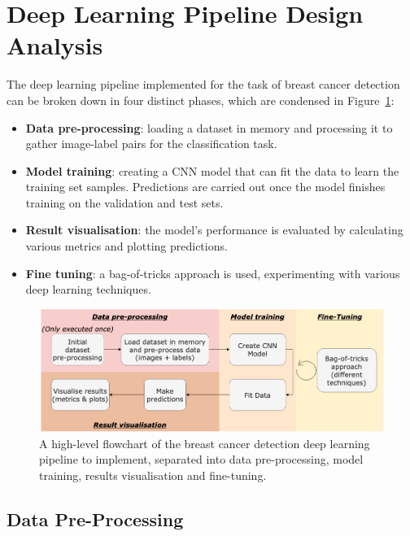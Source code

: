 \section{Deep Learning Pipeline Design Analysis}

The deep learning pipeline implemented for the task of breast cancer detection can be broken down in four distinct phases, which are condensed in Figure~\ref{fig:design-flowchart}:

\begin{itemize}
    \item \textbf{Data pre-processing}: loading a dataset in memory and processing it to gather image-label pairs for the classification task.
    \item \textbf{Model training}: creating a CNN model that can fit the data to learn the training set samples. Predictions are carried out once the model finishes training on the validation and test sets.
    \item \textbf{Result visualisation}: the model's performance is evaluated by calculating various metrics and plotting predictions.
    \item \textbf{Fine tuning}: a bag-of-tricks approach is used, experimenting with various deep learning techniques.
\end{itemize}

\begin{figure}[ht]
\centerline{\includegraphics[width=\textwidth]{figures/design/design flowchart.png}}
\caption{\label{fig:design-flowchart}A high-level flowchart of the breast cancer detection deep learning pipeline to implement, separated into data pre-processing, model training, results visualisation and fine-tuning.}
\end{figure}


\subsection{Data Pre-Processing}

